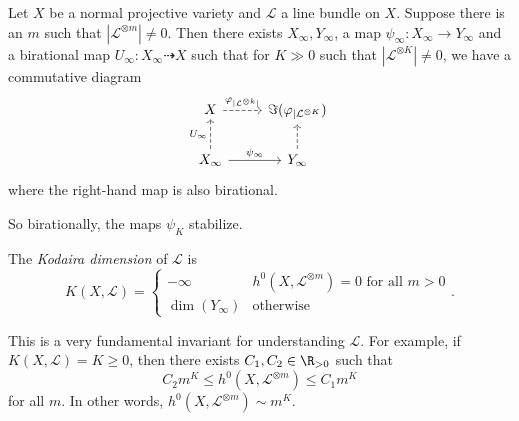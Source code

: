 \documentclass[a4paper]{article}
\begin{document}
\begin{thm}[Iitaka]
  Let $X$ be a normal projective variety and $\mathcal{L}$ a line bundle on $X$. Suppose there is an $m$ such that $|\mathcal{L}^{\otimes m}| \not= 0$. Then there exists $X_\infty, Y_\infty$, a map $\psi_\infty: X_\infty \to Y_\infty$ and a birational map $U_\infty: X_\infty \dashrightarrow X$ such that for $K \gg 0$ such that $|\mathcal{L}^{\otimes K}| \not= 0$, we have a commutative diagram
  \[
    \begin{tikzcd}
      X \ar[r, dashed, "\varphi_{|\mathcal{L}^{\otimes k}|}"] & \Im (\varphi_{|\mathcal{L}^{\otimes K}})\\
      X_\infty \ar[u, "U_\infty", dashed] \ar[r, "\psi_\infty"] & Y_\infty \ar[u, dashed]
    \end{tikzcd}
  \]
  where the right-hand map is also birational.
\end{thm}
So birationally, the maps $\psi_K$ stabilize.

\begin{defi}
  The \emph{Kodaira dimension} of $\mathcal{L}$ is
  \[
    K(X, \mathcal{L}) =
    \begin{cases}
      -\infty & h^0(X, \mathcal{L}^{\otimes m}) = 0\text{ for all }m > 0\\
      \dim (Y_\infty) & \text{otherwise}
    \end{cases}.
  \]
\end{defi}
This is a very fundamental invariant for understanding $\mathcal{L}$. For example, if $K(X, \mathcal{L}) = K \geq 0$, then there exists $C_1, C_2 \in \R_{>0}$ such that
\[
  C_2 m^K \leq h^0(X, \mathcal{L}^{\otimes m}) \leq C_1 m^K
\]
for all $m$. In other words, $h^0(X, \mathcal{L}^{\otimes m}) \sim m^K$.

\printindex
\end{document}
